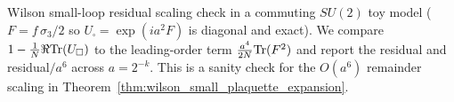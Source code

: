 \noindent\AuditTag Wilson small-loop residual scaling check in a commuting $SU(2)$ toy model ($F=f\,\sigma_3/2$ so $U_\square=\exp(i a^2 F)$ is diagonal and exact). We compare $1-\frac{1}{N}\Re\mathrm{Tr}(U_\square)$ to the leading-order term $\frac{a^4}{2N}\mathrm{Tr}(F^2)$ and report the residual and residual$/a^6$ across $a=2^{-k}$. This is a sanity check for the $O(a^6)$ remainder scaling in Theorem~\ref{thm:wilson_small_plaquette_expansion}.